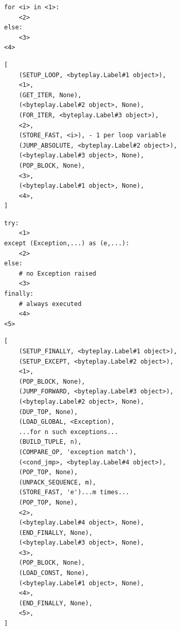 \documentclass{icldt}
\numberwithin{equation}{section}       %
\begin{document}
{{\newsavebox\forleft
\begin{lrbox}{\forleft}
\begin{lstlisting}
for <i> in <1>:
	<2>
else:
	<3>
<4>
\end{lstlisting}
\end{lrbox}
\newsavebox\forright
\begin{lrbox}{\forright}
\begin{lstlisting}
[
	(SETUP_LOOP, <byteplay.Label#1 object>),
	<1>,
	(GET_ITER, None),
	(<byteplay.Label#2 object>, None),	
	(FOR_ITER, <byteplay.Label#3 object>),
	<2>,
	(STORE_FAST, <i>), - 1 per loop variable
	(JUMP_ABSOLUTE, <byteplay.Label#2 object>),
	(<byteplay.Label#3 object>, None),
	(POP_BLOCK, None),
	<3>,
	(<byteplay.Label#1 object>, None),
	<4>,
]
\end{lstlisting}
\end{lrbox}

\newsavebox\tryleft
\begin{lrbox}{\tryleft}
\begin{lstlisting}
try:
	<1>
except (Exception,...) as (e,...):
	<2>
else: 
	# no Exception raised
	<3>
finally:
	# always executed
	<4>
<5>
\end{lstlisting}
\end{lrbox}
\newsavebox\tryright
\begin{lrbox}{\tryright}
\begin{lstlisting}
[
	(SETUP_FINALLY, <byteplay.Label#1 object>),
	(SETUP_EXCEPT, <byteplay.Label#2 object>),
	<1>,
	(POP_BLOCK, None),
	(JUMP_FORWARD, <byteplay.Label#3 object>),
	(<byteplay.Label#2 object>, None),
	(DUP_TOP, None),
	(LOAD_GLOBAL, <Exception),
	...for n such exceptions...
	(BUILD_TUPLE, n),
	(COMPARE_OP, 'exception match'),
	(<cond_jmp>, <byteplay.Label#4 object>),
	(POP_TOP, None),
	(UNPACK_SEQUENCE, m),
	(STORE_FAST, 'e')...m times...
	(POP_TOP, None),
	<2>,
	(<byteplay.Label#4 object>, None),
	(END_FINALLY, None),
	(<byteplay.Label#3 object>, None),
	<3>,
	(POP_BLOCK, None),
	(LOAD_CONST, None),
	(<byteplay.Label#1 object>, None),
	<4>,
	(END_FINALLY, None),
	<5>,
]
\end{lstlisting}
\end{lrbox}

}}
\end{document}
